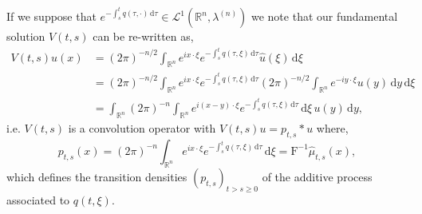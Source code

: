 \documentclass[a4paper, 12pt]{report}
\theoremstyle{cor}
\theoremstyle{remark}
\theoremstyle{definition}
\begin{document}
If we suppose that $e^{-\int_s^tq(\tau, \cdot)\,\mathrm{d}\tau} \in \mathcal{L}^1(\mathbb{R}^n, \lambda^{(n)})$ we note that our fundamental solution $V(t, s)$ can be re-written as,
\begin{align}
V(t, s)u(x) & = (2\pi)^{-n/2}\int_{\mathbb{R}^n}e^{ix\cdot\xi}e^{-\int_s^tq(\tau, \xi)\,\mathrm{d}\tau}\hat{u}(\xi)\,\mathrm{d}\xi\nonumber\\
& = (2\pi)^{-n/2}\int_{\mathbb{R}^n}e^{ix\cdot\xi}e^{-\int_s^tq(\tau, \xi)\,\mathrm{d}\tau}(2\pi)^{-n/2}\int_{\mathbb{R}^n}e^{-iy\cdot\xi}u(y)\,\mathrm{d}y\,\mathrm{d}\xi\nonumber\\
& = \int_{\mathbb{R}^n}(2\pi)^{-n}\int_{\mathbb{R}^n}e^{i(x - y)\cdot\xi}e^{-\int_s^tq(\tau, \xi)\,\mathrm{d}\tau}\,\mathrm{d}\xi\,u(y)\,\mathrm{d}y,\nonumber
\end{align}
i.e. $V(t, s)$ is a convolution operator with $V(t, s)u = p_{t, s} \ast u$ where,
\begin{equation}
p_{t, s}(x) = (2\pi)^{-n}\int_{\mathbb{R}^n}e^{ix\cdot\xi}e^{-\int_s^tq(\tau, \xi)\,\mathrm{d}\tau}\,\mathrm{d}\xi = \mathrm{F}^{-1}\hat{\mu}_{t, s}(x)\label{TD},
\end{equation}
which defines the transition densities $(p_{t, s})_{t > s \ge 0}$ of the additive process associated to $q(t, \xi)$.
\end{document}
